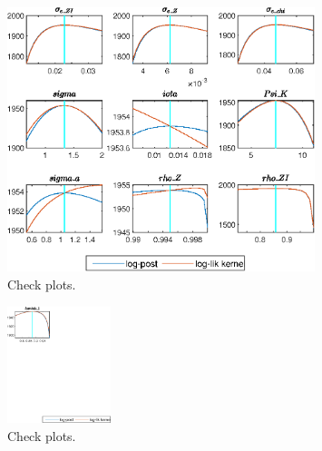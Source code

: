  
\begin{figure}[H]
\centering 
\includegraphics[width=0.80\textwidth]{two_sector_RBC_mobile/graphs/two_sector_RBC_mobile_CheckPlots1}
\caption{Check plots.}\label{Fig:CheckPlots:1}
\end{figure}
 
\begin{figure}[H]
\centering 
\includegraphics[width=0.27\textwidth]{two_sector_RBC_mobile/graphs/two_sector_RBC_mobile_CheckPlots2}
\caption{Check plots.}\label{Fig:CheckPlots:2}
\end{figure}
 
